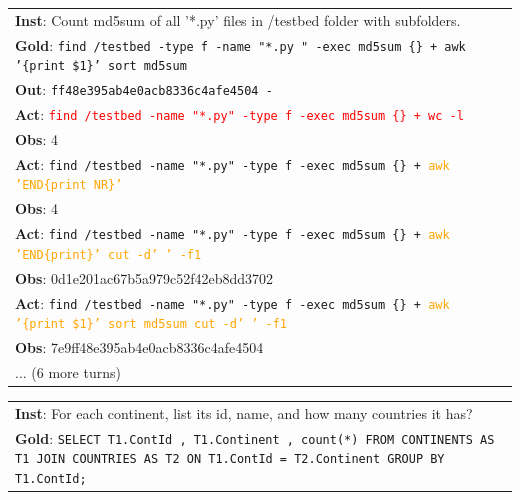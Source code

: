\begin{table}[H]
\footnotesize
\begin{minipage}[t]{.49\linewidth}
\begin{tabularx}{\textwidth}{X}
\toprule
\textbf{Inst}: Count md5sum of all '*.py' files in /testbed folder with subfolders. \\
\textbf{Gold}: \texttt{find /testbed -type f -name "*.py " -exec md5sum \{\} + \text{\textbar} awk '\{print \$1\}' \text{\textbar} sort \text{\textbar} md5sum} \\
\textbf{Out}: \texttt{ff48e395ab4e0acb8336c4afe4504  -} \\
\midrule
\textbf{Act}: \textcolor{red}{\texttt{find /testbed -name "*.py" -type f -exec md5sum \{\} + \text{\textbar} wc -l}} \\
\textbf{Obs}: 4 \\
\textbf{Act}: \texttt{find /testbed -name "*.py" -type f -exec md5sum \{\} + \text{\textbar} \textcolor{orange}{awk 'END\{print NR\}'}} \\
\textbf{Obs}: 4 \\
\textbf{Act}: \texttt{find /testbed -name "*.py" -type f -exec md5sum \{\} + \text{\textbar} \textcolor{orange}{awk 'END\{print\}' \text{\textbar} cut -d' ' -f1}}  \\
\textbf{Obs}: 0d1e201ac67b5a979c52f42eb8dd3702 \\
\textbf{Act}: \texttt{find /testbed -name "*.py" -type f -exec md5sum \{\} + \text{\textbar} \textcolor{orange}{awk '\{print \$1\}' \text{\textbar} sort \text{\textbar} md5sum \text{\textbar} cut -d' ' -f1}} \\
\textbf{Obs}: 7e9ff48e395ab4e0acb8336c4afe4504 \\
... (6 more turns) \\
\bottomrule
\end{tabularx}
\end{minipage}
\begin{minipage}[t]{.49\linewidth}
\begin{tabularx}{\textwidth}{X}
\toprule
\textbf{Inst}: For each continent, list its id, name, and how many countries it has? \\
\textbf{Gold}: \texttt{SELECT T1.ContId , T1.Continent , count(*) FROM CONTINENTS AS T1 JOIN COUNTRIES AS T2 ON T1.ContId = T2.Continent GROUP BY T1.ContId;} \\

\end{tabularx}
\end{minipage}
\end{table}
